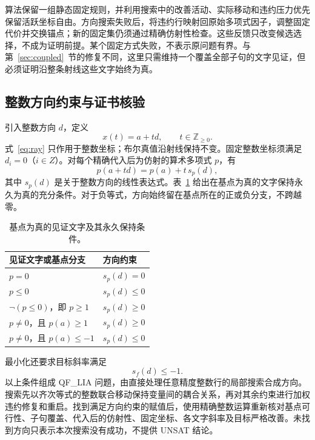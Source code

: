 算法保留一组静态固定规则，并利用搜索中的改善活动、实际移动和违约压力优先保留活跃坐标自由。方向搜索失败后，将违约行映射回原始多项式因子，调整固定代价并交换锚点；新的固定集仍须通过精确仿射性检查。这些反馈只改变候选选择，不成为证明前提。某个固定方式失败，不表示原问题有界。与第~\ref{sec:coupled}~节的修复不同，这里只需维持一个覆盖全部子句的文字见证，但必须证明沿整条射线这些文字始终为真。

\subsection{整数方向约束与证书核验}
引入整数方向 $d$，定义
\begin{equation}
 x(t)=a+td,\qquad t\in\mathbb Z_{\ge0}.
 \label{eq:ray}
\end{equation}
式~\eqref{eq:ray} 只作用于整数坐标；布尔真值沿射线保持不变。固定整数坐标须满足 $d_i=0$（$i\in Z$）。对每个精确代入后为仿射的算术多项式 $p$，有
\begin{equation}
 p(a+td)=p(a)+t\,s_p(d),
 \label{eq:slope}
\end{equation}
其中 $s_p(d)$ 是关于整数方向的线性表达式。表~\ref{tab:slopes} 给出在基点为真的文字保持永久为真的充分条件。对于负等式，方向始终留在基点所在的正或负分支，不跨越零。

\begin{table}[htbp]
\centering
\caption{基点为真的见证文字及其永久保持条件。}
\label{tab:slopes}
\begin{tabular}{ll}
\toprule
见证文字或基点分支 & 方向约束 \\
\midrule
$p=0$ & $s_p(d)=0$ \\
$p\le0$ & $s_p(d)\le0$ \\
$\neg(p\le0)$，即 $p\ge1$ & $s_p(d)\ge0$ \\
$p\ne0$，且 $p(a)\ge1$ & $s_p(d)\ge0$ \\
$p\ne0$，且 $p(a)\le-1$ & $s_p(d)\le0$ \\
\bottomrule
\end{tabular}
\end{table}

最小化还要求目标斜率满足
\begin{equation}
 s_f(d)\le-1.
 \label{eq:objective-slope}
\end{equation}
以上条件组成 QF\_LIA 问题，由直接处理任意精度整数行的局部搜索合成方向。搜索先以齐次等式的整数联合移动保持变量间的耦合关系，再对其余约束进行加权违约修复和重启。找到满足方向约束的赋值后，使用精确整数运算重新核对基点可行性、子句覆盖、代入后的仿射性、固定坐标、各文字斜率及目标严格改善。未找到方向只表示本次搜索没有成功，不提供 UNSAT 结论。

